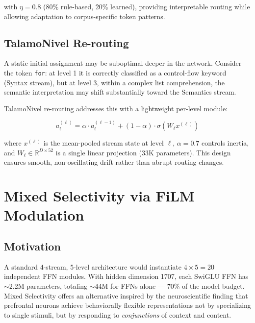 \documentclass[11pt,a4paper]{article}
\begin{document}
with $\eta = 0.8$ (80\% rule-based, 20\% learned), providing interpretable
routing while allowing adaptation to corpus-specific token patterns.

\subsection{TalamoNivel Re-routing}

A static initial assignment may be suboptimal deeper in the network.
Consider the token \texttt{for}: at level 1 it is correctly classified as a
control-flow keyword (Syntax stream), but at level 3, within a complex
list comprehension, the semantic interpretation may shift substantially toward
the Semantics stream.

TalamoNivel re-routing addresses this with a lightweight per-level module:

\begin{equation}
    a_t^{(\ell)} = \alpha \cdot a_t^{(\ell-1)}
                 + (1-\alpha) \cdot \sigma(W_\ell x^{(\ell)})
    \label{eq:talamo_nivel}
\end{equation}

where $x^{(\ell)}$ is the mean-pooled stream state at level $\ell$,
$\alpha = 0.7$ controls inertia, and $W_\ell \in \mathbb{R}^{D \times 52}$
is a single linear projection (33K parameters).  This design ensures smooth,
non-oscillating drift rather than abrupt routing changes.

\section{Mixed Selectivity via FiLM Modulation}
\label{sec:mixed}

\subsection{Motivation}

A standard 4-stream, 5-level architecture would instantiate
$4 \times 5 = 20$ independent FFN modules.  With hidden dimension 1707,
each SwiGLU FFN has $\sim$2.2M parameters, totaling $\sim$44M for FFNs alone
— 70\% of the model budget.  Mixed Selectivity offers an alternative inspired
by the neuroscientific finding \citep{rigotti2013importance} that prefrontal
neurons achieve behaviorally flexible representations not by specializing to
single stimuli, but by responding to \emph{conjunctions} of context and
content.
\end{document}
